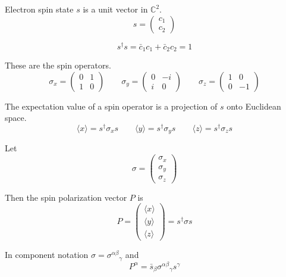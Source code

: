 \documentclass[12pt]{article}
\begin{document}
\noindent
Electron spin state $s$ is a unit vector in $\mathbb{C}^2$.
\begin{equation*}
s=\begin{pmatrix}c_1\\c_2\end{pmatrix}
\end{equation*}

\begin{equation*}
s^\dag s=\bar{c}_1c_1+\bar{c}_2c_2=1
\end{equation*}

\noindent
These are the spin operators.
\begin{equation*}
\sigma_x=\begin{pmatrix}0&1\\1&0\end{pmatrix}
\qquad
\sigma_y=\begin{pmatrix}0&-i\\i&0\end{pmatrix}
\qquad
\sigma_z=\begin{pmatrix}1&0\\0&-1\end{pmatrix}
\end{equation*}

\noindent
The expectation value of a spin operator is a projection of $s$ onto Euclidean space.
\begin{equation*}
\langle x\rangle=s^\dag\sigma_xs
\qquad
\langle y\rangle=s^\dag\sigma_ys
\qquad
\langle z\rangle=s^\dag\sigma_zs
\end{equation*}

\noindent
Let
\begin{equation*}
\sigma=\begin{pmatrix}\sigma_x\\\sigma_y\\\sigma_z\end{pmatrix}
\end{equation*}

\noindent
Then the spin polarization vector $P$ is
\begin{equation*}
P=\begin{pmatrix}\langle x\rangle\\\langle y\rangle\\\langle z\rangle\end{pmatrix}
=s^\dag\sigma s
\end{equation*}

\noindent
In component notation $\sigma=\sigma^{\alpha\beta}{}_\gamma$ and
\begin{equation*}
P^\alpha=\bar s_\beta\sigma^{\alpha\beta}{}_\gamma s^\gamma
\end{equation*}
\end{document}
